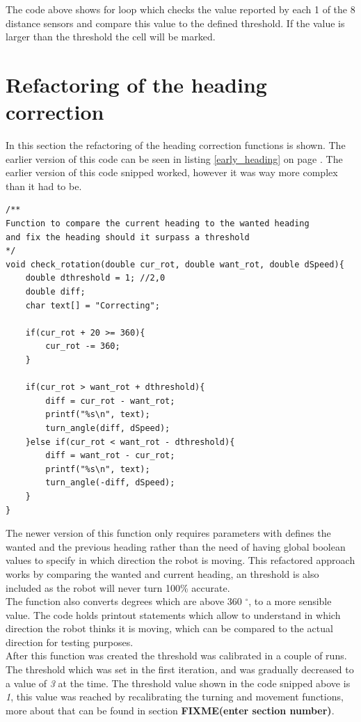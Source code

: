 The code above shows for loop which checks the value reported by each 1 of the 8 distance sensors and compare this value to the defined threshold. If the value is larger than the threshold the cell will be marked.

\section{Refactoring of the heading correction}
In this section the refactoring of the heading correction functions is shown.
The earlier version of this code can be seen in listing \ref{early_heading} on page \pageref{early_heading}.
The earlier version of this code snipped worked, however it was way more complex than it had to be.

\begin{lstlisting}[caption={Refactored heading control code} ]
/**
Function to compare the current heading to the wanted heading
and fix the heading should it surpass a threshold
*/
void check_rotation(double cur_rot, double want_rot, double dSpeed){
    double dthreshold = 1; //2,0
    double diff;
    char text[] = "Correcting";
    
    if(cur_rot + 20 >= 360){
        cur_rot -= 360;
    }
    
    if(cur_rot > want_rot + dthreshold){
        diff = cur_rot - want_rot;
        printf("%s\n", text);
        turn_angle(diff, dSpeed);
    }else if(cur_rot < want_rot - dthreshold){
        diff = want_rot - cur_rot;
        printf("%s\n", text);
        turn_angle(-diff, dSpeed);
    }
}
\end{lstlisting}

The newer version of this function only requires parameters with defines the wanted and the previous heading rather than the need of having global boolean values to specify in which direction the robot is moving.
This refactored approach works by comparing the wanted and current heading, an threshold is also included as the robot will never turn 100\% accurate. \\
The function also converts degrees which are above 360 $^{\circ}$, to a more sensible value.
The code holds printout statements which allow to understand in which direction the robot thinks it is moving, which can be compared to the actual direction for testing purposes. \\[3ex]

After this function was created the threshold was calibrated in a couple of runs. The threshold which was set in the first iteration, and was gradually decreased to a value of \textit{3} at the time. The threshold value shown in the code snipped above is \textit{1}, this value was reached by recalibrating the turning and movement functions, more about that can be found in section \textbf{FIXME(enter section number)}.

